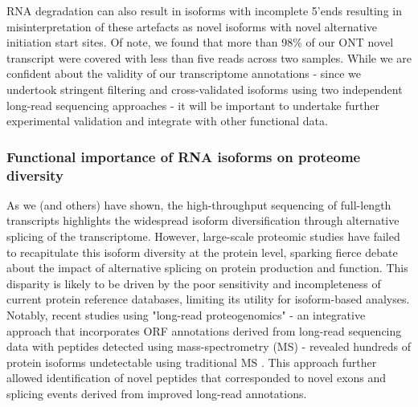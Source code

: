 RNA degradation can also result in isoforms with incomplete 5'ends resulting in misinterpretation of these artefacts as novel isoforms with novel alternative initiation start sites\cite{Kuo2020}. Of note, we found that more than 98\% of our ONT novel transcript were covered with less than five reads across two samples. While we are confident about the validity of our transcriptome annotations - since we undertook stringent filtering and cross-validated isoforms using two independent long-read sequencing approaches - it will be important to undertake further experimental validation and integrate with other functional data. 

\subsubsection{Functional importance of RNA isoforms on proteome diversity} 
\label{ch7: functional_importance}
As we (and others) have shown, the high-throughput sequencing of full-length transcripts highlights the widespread isoform diversification through alternative splicing of the transcriptome. However, large-scale proteomic studies have failed to recapitulate this isoform diversity at the protein level, sparking fierce debate about the impact of alternative splicing on protein production and function\cite{Tress2017a,Blencowe2017,Tress2017b}. This disparity is likely to be driven by the poor sensitivity and incompleteness of current protein reference databases, limiting its utility for isoform-based analyses\cite{Reixachs-Sole2022}. Notably, recent studies using "long-read proteogenomics" - an integrative approach that incorporates ORF annotations derived from long-read sequencing data with peptides detected using mass-spectrometry (MS) - revealed hundreds of protein isoforms undetectable using traditional MS \cite{Miller2022,Wang2019a}. This approach further allowed identification of novel peptides that corresponded to novel exons and splicing events derived from improved long-read annotations\cite{Miller2022,KayLeung2021}. 

